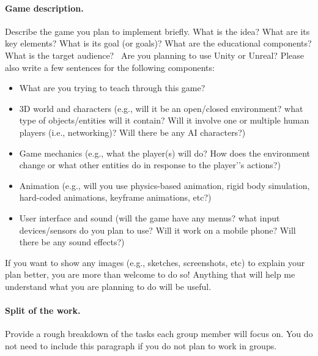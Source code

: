 \documentclass[11pt]{article}
\begin{document}
\maketitle
\paragraph*{Game description.}
Describe the game you plan to implement briefly. What is the idea? What are its key
elements? What is its goal (or goals)? What are the educational components? What is
the target audience? \ Are you planning to use Unity or Unreal? Please also write
a few sentences for the following components:
\begin{itemize}
\item What are you trying to teach through this game?
\item 3D world and characters (e.g., will it be an open/closed environment? what
type of objects/entities will it contain? Will it involve one or multiple human
players (i.e., networking)? Will there be any AI characters?)
\item Game mechanics (e.g., what the player(s) will do? How does the environment
change or what other entities do in response to the player’'s actions?)
\item Animation (e.g., will you use physics-based animation, rigid body simulation,
hard-coded animations, keyframe animations, etc?)
\item User interface and sound (will the game have any menus? what input
devices/sensors do you plan to use? Will it work on a mobile phone? Will there be
any sound effects?)
\end{itemize}
If you want to show any images (e.g., sketches, screenshots, etc) to explain your
plan better, you are more than welcome to do so! Anything that will help me
understand what you are planning to do will be useful.
\paragraph{Split of the work.}
Provide a rough breakdown of the tasks each group member will focus on. You do not
need to include this paragraph if you do not plan to work in groups.
\end{document}

